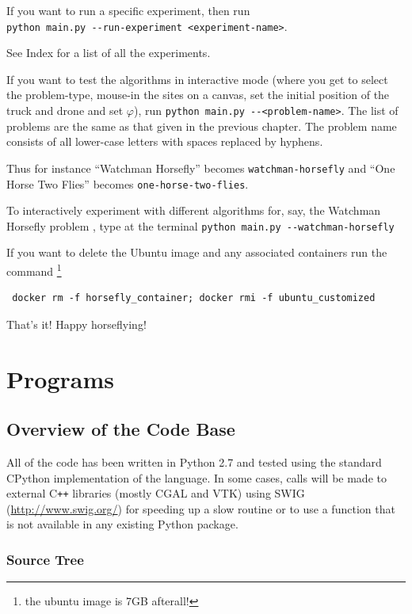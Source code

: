 \documentclass[11.5pt]{report}
\begin{document}
\begin{alphalist}
  If you want to run a specific experiment, then run \\ \verb|python main.py --run-experiment <experiment-name>|. 

  See Index for a list of all the experiments. 

\item {}  If you want to test the algorithms in interactive mode 
  (where you get to select the problem-type, mouse-in the sites on a canvas, set the initial position of 
  the truck and drone and set $\varphi$), run \verb|python main.py --<problem-name>|. The
  list of problems are the same as that given in the previous chapter. The problem name consists
  of all lower-case letters with spaces replaced by hyphens. 

  Thus for instance ``Watchman Horsefly'' becomes \verb|watchman-horsefly| and ``One Horse Two Flies''
  becomes \verb|one-horse-two-flies|. 

  To interactively experiment with different algorithms for, say, the Watchman Horsefly problem , 
  type at the terminal \verb|python main.py --watchman-horsefly|
\end{alphalist}

\vspace{1cm}

If you want to delete the Ubuntu image and any associated containers run the command \footnote{the ubuntu image is 7GB afterall!}
\begin{verbatim}
 docker rm -f horsefly_container; docker rmi -f ubuntu_customized
\end{verbatim}

That's it! Happy horseflying!
\part{Programs}
\chapter{Overview of the Code Base}

All of the code has been written in Python 2.7 and tested using the standard CPython
implementation of the language. In some cases, calls will be made to external C\texttt{++} 
libraries (mostly CGAL and VTK) using SWIG (\url{http://www.swig.org/})
for speeding up a slow routine or to use a function that is not available in any existing 
Python package.

\section{Source Tree}

\end{document}
